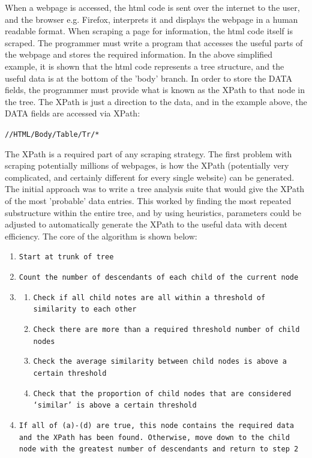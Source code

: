 \documentclass[11pt, oneside]{article}   	%
\begin{document}
When a webpage is accessed, the html code is sent over the internet to the user, and the browser e.g. Firefox, interprets it and displays the webpage in a human readable format. When scraping a page for information, the html code itself is scraped. The programmer must  write a program that accesses the useful parts of the webpage and stores the required information. In the above simplified example, it is shown that the html code represents a tree structure, and the useful data is at the bottom of the 'body' branch. In order to store the DATA fields, the programmer must provide what is known as the XPath to that node in the tree. The XPath is just a direction to the data, and in the example above, the DATA fields are accessed via XPath:\begin{center} \texttt{//HTML/Body/Table/Tr/*}\end{center}
The XPath is a required part of any scraping strategy. The first problem with scraping potentially millions of webpages, is how the XPath (potentially very complicated, and certainly different for every single website) can be generated. The initial approach was to write a tree analysis suite that would give the XPath of the most 'probable' data entries. This worked by finding the most repeated substructure within the entire tree, and by using heuristics, parameters could be adjusted to automatically generate the XPath to the useful data with decent efficiency. 
The core of the algorithm is shown below: 
\begin{sloppypar}
\begin{enumerate}
\item \texttt{Start at trunk of tree}
\item \texttt{Count the number of descendants of each child of the current node}
\item 
\begin{enumerate}
\item \texttt{Check if all child notes are all within a threshold of similarity to each other}
\item \texttt{Check there are more than a required threshold number of child nodes}
\item \texttt{Check the average similarity between child nodes is above a certain threshold}
\item \texttt{Check that the proportion of child nodes that are considered `similar' is above a certain threshold}
\end{enumerate}
\item \texttt{If all of (a)-(d) are true, this node contains the required data and the XPath has been found. Otherwise, move down to the child node with the greatest number of descendants and return to step 2}
\end{enumerate}
\end{sloppypar}
\end{document}
